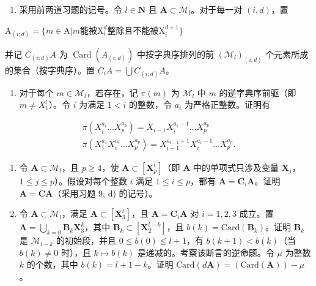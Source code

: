 \begin{enumerate}
\def\labelenumi{\arabic{enumi})}
\setcounter{enumi}{9}
\tightlist
\item
  采用前两道习题的记号。令 \(l \in \mathbf{N}\) 且 \(\mathbf{A} \subset \mathcal{M}_l\)。对于每一对 \((i, d)\)，置
\end{enumerate}

\(\mathrm{A}_{(i;d)} = \{m \in \mathrm{A} | m \text{能被} \mathrm{X}_i^d \text{整除且不能被} \mathrm{X}_i^{d+1}\}\)

并记 \(C_{(i;d)}A\) 为 \(\operatorname{Card}(A_{(i;d)})\) 中按字典序排列的前 \((\mathcal{M}_{l})_{(i;d)}\) 个元素所成的集合（按字典序）。置 \(C_{i}A = \bigcup C_{(i;d)}A\)。

\begin{enumerate}
\def\labelenumi{\alph{enumi})}
\tightlist
\item
  对于每个 \(m \in \mathcal{M}_{l}\)，若存在，记 \(\pi(m)\) 为 \(\mathcal{M}_{l}\) 中 \(m\) 的逆字典序前驱（即 \(m \neq X_{1}^{l}\)）。令 \(i\) 为满足 \(1 < i\) 的整数，令 \(a_{i}\) 为严格正整数。证明有
\end{enumerate}

\[
\begin{array}{c} \pi (X _ {i} ^ {a _ {i}} \dots X _ {p} ^ {a _ {p}}) = X _ {i - 1} X _ {i} ^ {a _ {i} - 1} \dots X _ {p} ^ {a _ {p}} \\ \pi (X _ {1} ^ {a _ {1}} X _ {i} ^ {a _ {i}} \dots X _ {p} ^ {a _ {p}}) = X _ {i - 1} ^ {a _ {i - 1} + 1} X _ {i} ^ {a _ {i} - 1} \dots X _ {p} ^ {a _ {p}}. \end{array}
\]

\begin{enumerate}
\def\labelenumi{\alph{enumi})}
\setcounter{enumi}{1}
\item
  令 \(\mathbf{A} \subset \mathcal{M}_l\)，且 \(p \geqslant 4\)，使 \(\mathbf{A} \subset [\mathbf{X}_p^l]\)（即 \(\mathbf{A}\) 中的单项式只涉及变量 \(\mathbf{X}_j\)，\(1 \leqslant j \leqslant p\)）。假设对每个整数 \(i\) 满足 \(1 \leqslant i \leqslant p\)，都有 \(\mathbf{A} = \mathbf{C}_i\mathbf{A}\)。证明 \(\mathbf{A} = \mathbf{CA}\)（采用习题 9, d) 的记号）。
\item
  令 \(\mathbf{A} \subset \mathcal{M}_l\)，满足 \(\mathbf{A} \subset [\mathbf{X}_3^l]\)，且 \(\mathbf{A} = \mathbf{C}_i\mathbf{A}\) 对 \(i = 1, 2, 3\) 成立。置 \(\mathbf{A} = \bigcup_{k=0} \mathbf{B}_k\mathbf{X}_3^{k}\)，其中 \(\mathbf{B}_k \subset [\mathbf{X}_2^{l-k}]\)，且 \(b(k) = \text{Card}(\mathbf{B}_k)\)。证明 \(\mathbf{B}_k\) 是 \(\mathcal{M}_{l-k}\) 的初始段，并且 \(0 \leqslant b(0) \leqslant l + 1\)，有 \(b(k+1) < b(k)\)（当 \(b(k) \neq 0\) 时），且 \(k \mapsto b(k)\) 是递减的。考察该断言的逆命题。令 \(\mu\) 为整数 \(k\) 的个数，其中 \(b(k) = l + 1 - k\)。证明 \(\text{Card}(d\mathbf{A}) = (\text{Card}(\mathbf{A})) - \mu\)。
\end{enumerate}

